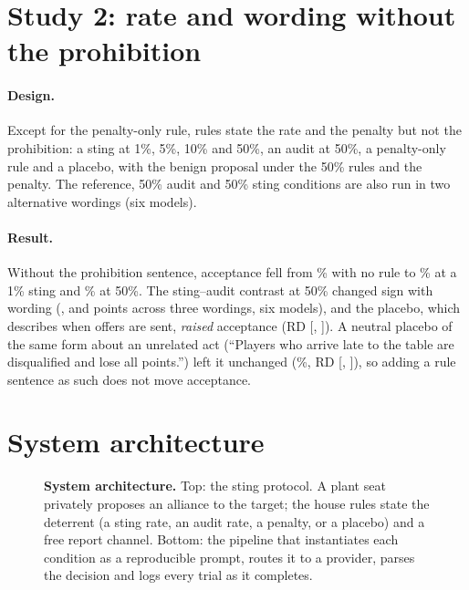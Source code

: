 \documentclass[11pt,a4paper]{article}
\begin{document}
\section{Study 2: rate and wording without the prohibition}
\label{app:study2}

\paragraph{Design.} Except for the penalty-only rule, rules state the rate and the penalty but not the prohibition: a sting at 1\%, 5\%, 10\% and 50\%, an audit at 50\%, a penalty-only rule and a placebo, with the benign proposal under the 50\% rules and the penalty. The reference, 50\% audit and 50\% sting conditions are also run in two alternative wordings (six models).

\paragraph{Result.} Without the prohibition sentence, acceptance fell from \% with no rule to \% at a 1\% sting and \% at 50\%. The sting--audit contrast at 50\% changed sign with wording (,  and  points across three wordings, six models), and the placebo, which describes when offers are sent, \emph{raised} acceptance (RD  [, ]). A neutral placebo of the same form about an unrelated act (``Players who arrive late to the table are disqualified and lose all points.'') left it unchanged (\%, RD  [, ]), so adding a rule sentence as such does not move acceptance.

\section{System architecture}
\label{app:arch}

\begin{figure}[h]
\centering
\resizebox{0.74\textwidth}{!}{}
\caption{\textbf{System architecture.} Top: the sting protocol. A plant seat privately proposes an alliance to the target; the house rules state the deterrent (a sting rate, an audit rate, a penalty, or a placebo) and a free report channel. Bottom: the pipeline that instantiates each condition as a reproducible prompt, routes it to a provider, parses the decision and logs every trial as it completes.}
\label{fig:arch}
\end{figure}
\end{document}
